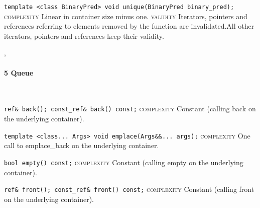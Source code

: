 \noindent{}\hspace*{0.25em}\lstinline[basicstyle=\ttfamily\color{corange}]{template <class BinaryPred> void unique(BinaryPred binary_pred);} \textsc{complexity} Linear in container size minus one. \textsc{validity} Iterators, pointers and references referring to elements removed by the function are invalidated.All other iterators, pointers and references keep their validity.\\\vspace{-0.6em}


\sep
{}
\paragraph{5 Queue}\mbox{}\vspace{0.5em}\\
\noindent{}\hspace*{0.25em}\lstinline[basicstyle=\ttfamily\color{cgreen}]{ref& back(); const_ref& back() const;} \textsc{complexity} Constant (calling back on the underlying container).\\\vspace{-0.6em}

\noindent{}\hspace*{0.25em}\lstinline{template <class... Args> void emplace(Args&&... args);} \textsc{complexity} One call to emplace\_back on the underlying container.\\\vspace{-0.6em}

\noindent{}\hspace*{0.25em}\lstinline[basicstyle=\ttfamily\color{cgreen}]{bool empty() const;} \textsc{complexity} Constant (calling empty on the underlying container).\\\vspace{-0.6em}

\noindent{}\hspace*{0.25em}\lstinline[basicstyle=\ttfamily\color{cgreen}]{ref& front(); const_ref& front() const;} \textsc{complexity} Constant (calling front on the underlying container).\\\vspace{-0.6em}

